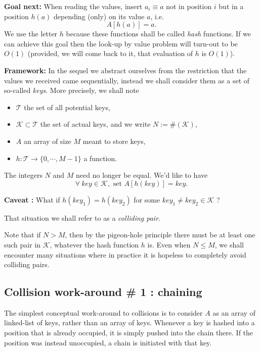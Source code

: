 \documentclass[12pt]{article}
\theoremstyle{plain}
\theoremstyle{remark}
\begin{document}
\medskip

{\bf Goal next:} When reading the values, insert $a_i \equiv a$ not in position
$i$ but in a position $h(a)$ depending (only) on its value $a$, i.e.
$$
A[h(a)] = a.
$$
We use the letter $h$ because these functions shall be called {\it hash}
functions. If we can achieve this goal then the look-up by value problem 
will turn-out to be $O(1)$ (provided, we will come back to it, that 
evaluation of $h$ is $O(1)$).

\medskip
{\bf Framework:} In the sequel we abstract ourselves from the restriction
that the values we received came sequentially, instead we shall consider
them as a set of so-called {\it keys}. More precisely, we shall note 
\begin{itemize}
	\item $\mathcal{T}$ the set of all potential keys,
	\item $\mathcal{K} \subset \mathcal{T}$ the set of actual keys, and we
		write $N := \#(\mathcal{K})$,
	\item $A$ an array of size $M$ meant to store keys,
	\item $h : \mathcal{T} \to \{0,\cdots, M-1\}$ a function.
\end{itemize}
The integers $N$ and $M$ need no longer be equal. We'd like to have
$$
\forall\ key \in \mathcal{K}, \text{ set } A[h(key)] = key.
$$

{\bf Caveat :} What if $h(key_1) = h(key_2)$ for some $key_1 \neq key_2 \in
\mathcal{K}$ ?

That situation we shall refer to as a {\it colliding pair}.

Note that if $N > M$, then by the pigeon-hole principle there must be at least
one such pair in $\mathcal{K}$, whatever the hash function $h$ is. Even when 
$N \leq M$, we shall encounter many situations where in practice it is
hopeless to completely avoid colliding pairs.

\subsection{Collision work-around \# 1 : chaining} 

The simplest conceptual work-around to collisions is to consider $A$ as
an array of linked-list of keys, rather than an array of keys. Whenever
a key is hashed into a position that is already occupied, it is simply 
pushed into the chain there. If the position was instead unoccupied, a
chain is initiated with that key.
\end{document}
